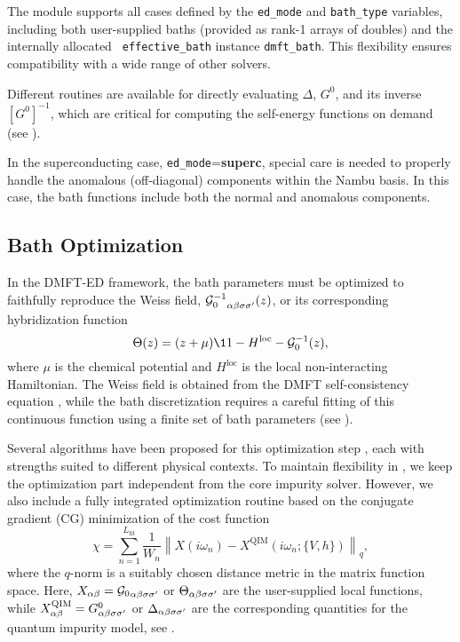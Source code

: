 \documentclass[edipack_sp.tex]{subfiles}
\begin{document}
The module supports all cases defined by the {\tt ed\_mode} and 
{\tt bath\_type} variables, including both user-supplied baths (provided 
as rank-1 arrays of doubles) and the internally allocated {\tt 
effective\_bath} instance {\tt dmft\_bath}. This flexibility ensures 
compatibility with a wide range of other solvers.

Different routines are available for directly evaluating $\Delta$, 
$G^0$, and its inverse $[G^0]^{-1}$, which are critical for computing 
the self-energy functions on demand (see ). 

In the superconducting case, {\tt ed\_mode}={\bf superc}, 
special care is needed to properly handle the anomalous (off-diagonal) 
components within the Nambu basis. In this case, the bath functions 
include both the normal and anomalous components. 



\subsection{Bath Optimization}\label{sSecFit}
In the DMFT-ED framework, the bath parameters must be optimized to 
faithfully reproduce the Weiss field, 
${{\cal G}^{-1}_{0}}_{\alpha\beta\sigma\sigma'}(z)$, or its corresponding hybridization 
function 
\begin{equation}
\Theta(z) = (z + \mu)\11 - H^\mathrm{loc} - \GG_0^{-1}(z),
\end{equation}
where $\mu$ is the chemical potential and $H^\mathrm{loc}$ is the 
local non-interacting Hamiltonian. The Weiss field is obtained from the DMFT 
self-consistency equation \cite{Georges1996RMP}, while the bath 
discretization requires a careful fitting of this continuous function 
using a finite set of bath parameters (see ).

Several algorithms have been proposed for this optimization 
step \cite{Garcia2004PRL,Taranto2012PRB,Mejuto-Zaera2020PRB}, each with strengths suited 
to different physical contexts. To maintain flexibility in \NAME, 
we keep the optimization part independent 
from the core impurity solver. However, we also include a fully 
integrated optimization routine based on the conjugate gradient (CG) 
minimization of the cost function
\begin{equation}
\chi = \sum_{n=1}^{L_\mathrm{fit}} 
\frac{1}{W_n} \left\|X(i\omega_n) - 
X^\mathrm{QIM}(i\omega_n; \{V, h\}) \right\|_q,
\label{eq:chiq}
\end{equation}
where the $q$-norm is a suitably chosen distance metric in the 
matrix function space. Here, $X_{\alpha\beta} = {{\cal G}_{0}}_{\alpha\beta\sigma\sigma'}$ or 
$\Theta_{\alpha\beta\sigma\sigma'}$ are the user-supplied local functions, while 
$X_{\alpha\beta}^\mathrm{QIM} = G^0_{\alpha\beta\sigma\sigma'}$ or 
$\Delta_{\alpha\beta\sigma\sigma'}$ are the corresponding quantities for the quantum 
impurity model, see .
\end{document}
